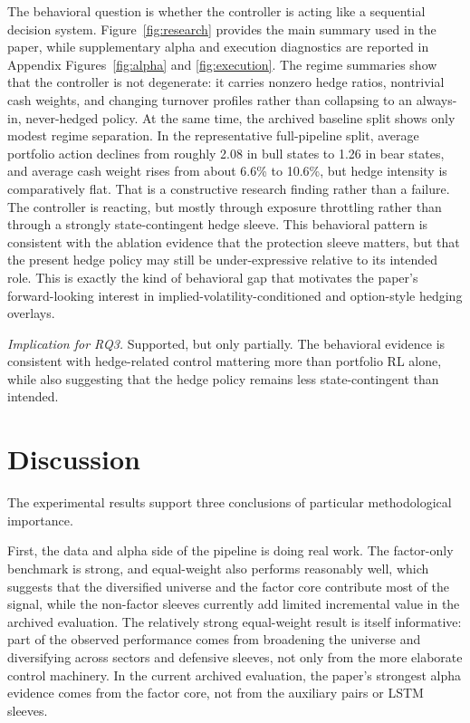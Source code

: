 \documentclass[10pt,twocolumn]{article}
\begin{document}
The behavioral question is whether the controller is acting like a sequential
decision system. Figure~\ref{fig:research} provides the main summary used in the
paper, while supplementary alpha and execution diagnostics are reported in
Appendix Figures~\ref{fig:alpha} and \ref{fig:execution}. The regime
summaries show that the controller is not degenerate:
it carries nonzero hedge ratios, nontrivial cash weights, and changing turnover
profiles rather than collapsing to an always-in, never-hedged policy. At the
same time, the archived baseline split shows only modest regime separation. In
the representative full-pipeline split, average portfolio action declines from
roughly 2.08 in bull states to 1.26 in bear states, and average cash weight
rises from about 6.6\% to 10.6\%, but hedge intensity is comparatively flat.
That is a constructive research finding rather than a failure. The controller is
reacting, but mostly through exposure throttling rather than through a strongly
state-contingent hedge sleeve. This behavioral pattern is consistent with the
ablation evidence that the protection sleeve matters, but that the present hedge
policy may still be under-expressive relative to its intended role. This is
exactly the kind of behavioral gap that motivates the paper's forward-looking
interest in implied-volatility-conditioned and option-style hedging overlays.

\noindent\textit{Implication for RQ3.} Supported, but only partially. The
behavioral evidence is consistent with hedge-related control mattering more than
portfolio RL alone, while also suggesting that the hedge policy remains less
state-contingent than intended.

\section{Discussion}

The experimental results support three conclusions of particular methodological importance.

First, the data and alpha side of the pipeline is doing real work. The
factor-only benchmark is strong, and equal-weight also performs reasonably well,
which suggests that the diversified universe and the factor core contribute most
of the signal, while the non-factor sleeves currently add limited incremental
value in the archived evaluation. The relatively strong equal-weight result is
itself informative: part of the observed performance comes from broadening the
universe and diversifying across sectors and defensive sleeves, not only from
the more elaborate control machinery. In the current archived evaluation, the
paper's strongest alpha evidence comes from the factor core, not from the
auxiliary pairs or LSTM sleeves.
\end{document}
